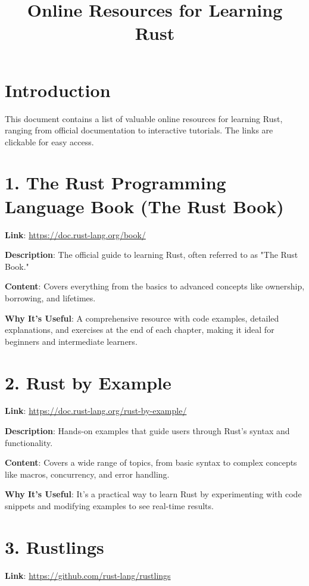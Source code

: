 \documentclass[12pt]{article}
\title{Online Resources for Learning Rust}
\author{}
\date{}
\begin{document}
	
	\maketitle
	
	\section*{Introduction}
	This document contains a list of valuable online resources for learning Rust, ranging from official documentation to interactive tutorials. The links are clickable for easy access.
	
	\section*{1. The Rust Programming Language Book (The Rust Book)}
	\textbf{Link}: \href{https://doc.rust-lang.org/book/}{https://doc.rust-lang.org/book/}
	
	\textbf{Description}: The official guide to learning Rust, often referred to as "The Rust Book."
	
	\textbf{Content}: Covers everything from the basics to advanced concepts like ownership, borrowing, and lifetimes.
	
	\textbf{Why It’s Useful}: A comprehensive resource with code examples, detailed explanations, and exercises at the end of each chapter, making it ideal for beginners and intermediate learners.
	
	\section*{2. Rust by Example}
	\textbf{Link}: \href{https://doc.rust-lang.org/rust-by-example/}{https://doc.rust-lang.org/rust-by-example/}
	
	\textbf{Description}: Hands-on examples that guide users through Rust’s syntax and functionality.
	
	\textbf{Content}: Covers a wide range of topics, from basic syntax to complex concepts like macros, concurrency, and error handling.
	
	\textbf{Why It’s Useful}: It’s a practical way to learn Rust by experimenting with code snippets and modifying examples to see real-time results.
	
	\section*{3. Rustlings}
	\textbf{Link}: \href{https://github.com/rust-lang/rustlings}{https://github.com/rust-lang/rustlings}
	
\end{document}

